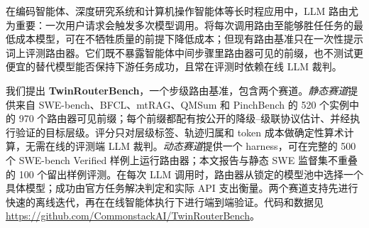 在编码智能体、深度研究系统和计算机操作智能体等长时程应用中，LLM 路由尤为重要：一次用户请求会触发多次模型调用。将每次调用路由至能够胜任任务的最低成本模型，可在不牺牲质量的前提下降低成本；但现有路由基准只在一次性提示词上评测路由器。它们既不暴露智能体中间步骤里路由器可见的前缀，也不测试更便宜的替代模型能否保持下游任务成功，且常在评测时依赖在线 LLM 裁判。

我们提出 \textbf{TwinRouterBench}，一个步级路由基准，包含两个赛道。\emph{静态赛道}提供来自 SWE-bench、BFCL、mtRAG、QMSum 和 PinchBench 的 520 个实例中的 970 个路由器可见前缀；每个前缀都配有按公开的降级--级联协议估计、并经执行验证的目标层级。评分只对层级标签、轨迹归属和 token 成本做确定性算术计算，无需在线的评测端 LLM 裁判。\emph{动态赛道}提供一个 harness，可在完整的 500 个 SWE-bench Verified 样例上运行路由器；本文报告与静态 SWE 监督集不重叠的 100 个留出样例评测。在每次 LLM 调用时，路由器从锁定的模型池中选择一个具体模型；成功由官方任务解决判定和实际 API 支出衡量。两个赛道支持先进行快速的离线迭代，再在在线智能体执行下进行端到端验证。代码和数据见 \url{https://github.com/CommonstackAI/TwinRouterBench}。

